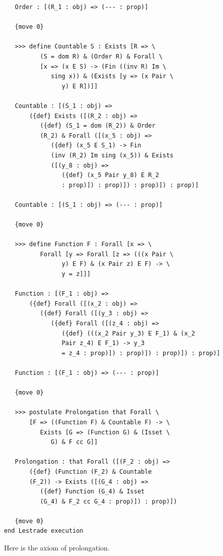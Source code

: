 \documentclass[12pt]{article}
\begin{document}
\begin{verbatim}
   Order : [(R_1 : obj) => (--- : prop)]

   {move 0}

   >>> define Countable S : Exists [R => \
          (S = dom R) & (Order R) & Forall \
          [x => (x E S) -> (Fin ((inv R) Im \
             sing x)) & (Exists [y => (x Pair \
                y) E R])]]

   Countable : [(S_1 : obj) => 
       ({def} Exists ([(R_2 : obj) => 
          ({def} (S_1 = dom (R_2)) & Order 
          (R_2) & Forall ([(x_5 : obj) => 
             ({def} (x_5 E S_1) -> Fin 
             (inv (R_2) Im sing (x_5)) & Exists 
             ([(y_8 : obj) => 
                ({def} (x_5 Pair y_8) E R_2 
                : prop)]) : prop)]) : prop)]) : prop)]

   Countable : [(S_1 : obj) => (--- : prop)]

   {move 0}

   >>> define Function F : Forall [x => \
          Forall [y => Forall [z => (((x Pair \
                y) E F) & (x Pair z) E F) -> \
                y = z]]]

   Function : [(F_1 : obj) => 
       ({def} Forall ([(x_2 : obj) => 
          ({def} Forall ([(y_3 : obj) => 
             ({def} Forall ([(z_4 : obj) => 
                ({def} (((x_2 Pair y_3) E F_1) & (x_2 
                Pair z_4) E F_1) -> y_3 
                = z_4 : prop)]) : prop)]) : prop)]) : prop)]

   Function : [(F_1 : obj) => (--- : prop)]

   {move 0}

   >>> postulate Prolongation that Forall \
       [F => ((Function F) & Countable F) -> \
          Exists [G => (Function G) & (Isset \
             G) & F cc G]]

   Prolongation : that Forall ([(F_2 : obj) => 
       ({def} (Function (F_2) & Countable 
       (F_2)) -> Exists ([(G_4 : obj) => 
          ({def} Function (G_4) & Isset 
          (G_4) & F_2 cc G_4 : prop)]) : prop)])

   {move 0}
end Lestrade execution
\end{verbatim}

Here is the axiom of prolongation.


 
 
 
\end{document}
